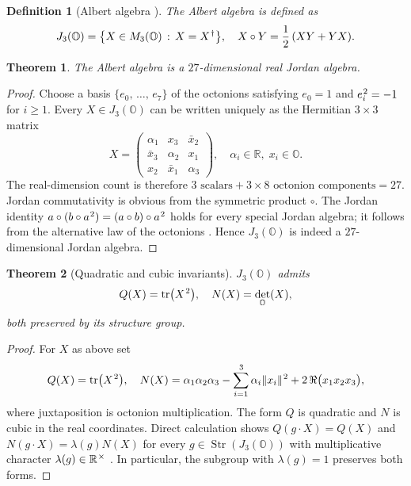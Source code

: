 \documentclass[pdflatex,sn-mathphys-num]{sn-jnl}
\theoremstyle{thmstyleone}
\newtheorem{theorem}{Theorem}
\theoremstyle{thmstyletwo}%
\theoremstyle{thmstylethree}%
\newtheorem{definition}{Definition}%
\newcommand{\Oct}{\mathbb{O}}
\newcommand{\jalg}{J_3(\mathbb{O})}
\newcommand{\tr}{\operatorname{tr}}
\newcommand{\sm}{\hspace{.065em}}
\newcommand{\Str}{\operatorname{Str}}
\newcommand{\smexp}[1]{^{\sm #1}}
\begin{document}
\begin{definition}[Albert algebra {\cite{Albert:1934,McCrimmon:2004}}]
The \emph{Albert algebra} is defined as
\[
  \jalg=\bigl\{X\in M_{3}(\Oct) \,:\, X=X\smexp{\dagger}\bigr\},
  \quad
  X\circ Y=\frac12\,(XY+YX).
\]
\end{definition}

\begin{theorem}\label{thm:JordanDim}
The Albert algebra is a $27$-dimensional real Jordan algebra.
\end{theorem}

\begin{proof}
Choose a basis $\{e_{0},\,\dots,\,e_{7}\}$ of the octonions satisfying $e_{0}=1$
and $e_{i}\smexp{2}=-1$ for $i\ge1$.  
Every $X\in\jalg$ can be written uniquely as the Hermitian $3\times3$ matrix
\[
  X=\begin{pmatrix}
        \alpha_{1} & x_{3} & \bar x_{2}\\
        \bar x_{3} & \alpha_{2} & x_{1}\\
        x_{2} & \bar x_{1} & \alpha_{3}
      \end{pmatrix},
  \quad
  \alpha_{i}\in\mathbb R,
  \;
  x_{i}\in\Oct.
\]
The real-dimension count is therefore
$3\text{ scalars}+3\times8\text{ octonion components}=27$.
Jordan commutativity is obvious from the symmetric product $\circ$.  
The Jordan identity
$a\circ(b\circ a\smexp{2})=(a\circ b)\circ a\smexp{2}$
holds for every special Jordan algebra; it follows from the alternative law of the octonions \cite{McCrimmon:2004}.  Hence $\jalg$ is indeed a $27$-dimensional Jordan algebra.
\end{proof}

\begin{theorem}[Quadratic and cubic invariants]\label{thm:Invs}
$\jalg$ admits  
\[
  Q(X)=\tr\bigl(X\smexp{2}\bigr), 
  \quad
  N(X)=\det_{\Oct}(X),
\]
both preserved by its structure group.
\end{theorem}

\begin{proof}
For $X$ as above set
\[
  Q(X)=\tr\bigl(X\smexp{2}\bigr),
  \quad
  N(X)=\alpha_{1}\alpha_{2}\alpha_{3}-\sum_{i=1}\smexp{3}\alpha_{i}\|x_{i}\|\smexp{2}
        +2\,\Re\bigl(x_{1}x_{2}x_{3}\bigr),
\]
where juxtaposition is octonion multiplication. The form $Q$ is quadratic and $N$ is cubic in the real coordinates. Direct calculation shows
$
  Q(g \cdot X)=Q(X)
$
and
$
  N(g \cdot X)=\lambda(g)N(X)
$
for every $g\in\Str(\jalg)$ with multiplicative character $\lambda(g)\in\mathbb R\smexp{\times}$ \cite{Jacobson:1968}. In particular, the subgroup with $\lambda(g)=1$ preserves both forms.
\end{proof}
\end{document}
